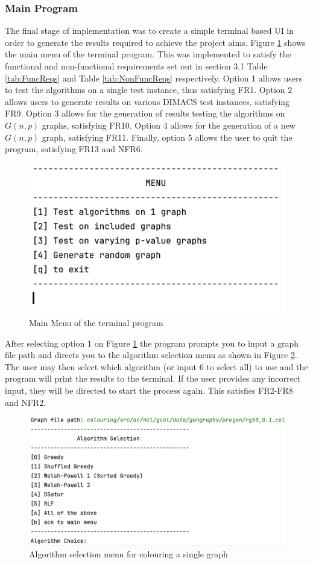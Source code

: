 \subsubsection{Main Program}
The final stage of implementation was to create a simple terminal based UI in order to generate the results required to achieve the project aims. Figure \ref{fig:MainMenu} shows the main menu of the terminal program. This was implemented to satisfy the functional and non-functional requirements set out in section 3.1 Table \ref{tab:FuncReqs} and Table \ref{tab:NonFuncReqs} respectively. Option 1 allows users to test the algorithms on a single test instance, thus satisfying FR1. Option 2 allows users to generate results on various DIMACS test instances, satisfying FR9. Option 3 allows for the generation of results testing the algorithms on $G(n, p)$ graphs, satisfying FR10. Option 4 allows for the generation of a new $G(n, p)$ graph, satisfying FR11. Finally, option 5 allows the user to quit the program, satisfying FR13 and NFR6. 
\begin{figure}[H]
    \centering
    \includegraphics[width=0.5\linewidth]{Components/MainMenu.png}
    \caption{Main Menu of the terminal program}
    \label{fig:MainMenu}
\end{figure}

After selecting option 1 on Figure \ref{fig:MainMenu} the program prompts you to input a graph file path and directs you to the algorithm selection menu as shown in Figure \ref{fig:AlgSelect}. The user may then select which algorithm (or input 6 to select all) to use and the program will print the results to the terminal. If the user provides any incorrect input, they will be directed to start the process again. This satisfies FR2-FR8 and NFR2. 

\begin{figure}[H]
    \centering
    \includegraphics[width=0.5\linewidth]{Components/AlgorithmSelection.png}
    \caption{Algorithm selection menu for colouring a single graph}
    \label{fig:AlgSelect}
\end{figure}

